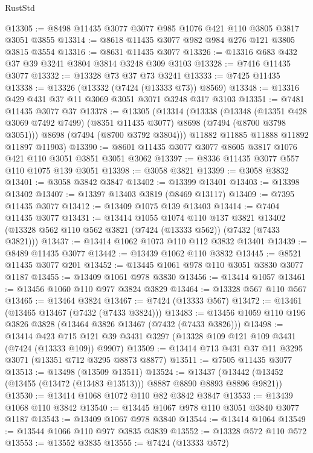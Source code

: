 \begin{lexlean}{RustStd}
\begin{coremodule}
@13305 := @8498 @11435 @3077 @3077 @985 @1076 @421 @110 @3805 @3817 @3051 @3855
@13314 := @8618 @11435 @3077 @982 @984 @276 @121 @3805 @3815 @3554
@13316 := @8631 @11435 @3077
@13326 := @13316 @683 @432 @37 @39 @3241 @3804 @3814 @3248 @309 @3103
@13328 := @7416 @11435 @3077
@13332 := @13328 @73 @37 @73 @3241
@13333 := @7425 @11435
@13338 := @13326 (@13332 (@7424 (@13333 @73)) @8569)
@13348 := @13316 @429 @431 @37 @11 @3069 @3051 @3071 @3248 @317 @3103
@13351 := @7481 @11435 @3077 @37
@13378 := @13305
    (@13314
      (@13338
        (@13348
          (@13351 @428 @3069 @7492 @7499)
          (@8351 @11435 @3077)
          @8698
          (@7494 (@8700 @3798 @3051)))
        @8698
        (@7494 (@8700 @3792 @3804)))
      @11882
      @11885
      @11888
      @11892
      @11897
      @11903)
@13390 := @8601 @11435 @3077 @3077 @8605 @3817 @1076 @421 @110 @3051 @3851 @3051 @3062
@13397 := @8336 @11435 @3077 @557 @110 @1075 @139 @3051
@13398 := @3058 @3821
@13399 := @3058 @3832
@13401 := @3058 @3842 @3847
@13402 := @13399 @13401
@13403 := @13398 @13402
@13407 := @13397 @13403 @3819 (@8469 @13117)
@13409 := @7395 @11435 @3077
@13412 := @13409 @1075 @139 @13403
@13414 := @7404 @11435 @3077
@13431 := @13414
    @1055
    @1074
    @110
    @137
    @3821
    @13402
    (@13328 @562 @110 @562 @3821 (@7424 (@13333 @562)) (@7432 (@7433 @3821)))
@13437 := @13414 @1062 @1073 @110 @112 @3832 @13401
@13439 := @8489 @11435 @3077
@13442 := @13439 @1062 @110 @3832
@13445 := @8521 @11435 @3077 @201
@13452 := @13445 @1061 @978 @110 @3051 @3830 @3077 @1187
@13455 := @13409 @1061 @978 @3830
@13456 := @13414 @1057
@13461 := @13456 @1060 @110 @977 @3824 @3829
@13464 := @13328 @567 @110 @567
@13465 := @13464 @3824
@13467 := @7424 (@13333 @567)
@13472 := @13461 (@13465 @13467 (@7432 (@7433 @3824)))
@13483 := @13456 @1059 @110 @196 @3826 @3828 (@13464 @3826 @13467 (@7432 (@7433 @3826)))
@13498 := @13414
    @423
    @715
    @121
    @39
    @3431
    @3297
    (@13328 @109 @121 @109 @3431 (@7424 (@13333 @109)) @9907)
@13509 := @13414 @713 @431 @37 @11 @3295 @3071 (@13351 @712 @3295 @8873 @8877)
@13511 := @7505 @11435 @3077
@13513 := @13498 (@13509 @13511)
@13524 := @13437 (@13442 (@13452 (@13455 (@13472 (@13483 @13513))) @8887 @8890 @8893 @8896 @9821))
@13530 := @13414 @1068 @1072 @110 @82 @3842 @3847
@13533 := @13439 @1068 @110 @3842
@13540 := @13445 @1067 @978 @110 @3051 @3840 @3077 @1187
@13543 := @13409 @1067 @978 @3840
@13544 := @13414 @1064
@13549 := @13544 @1066 @110 @977 @3835 @3839
@13552 := @13328 @572 @110 @572
@13553 := @13552 @3835
@13555 := @7424 (@13333 @572)

\end{coremodule}
\end{lexlean}
